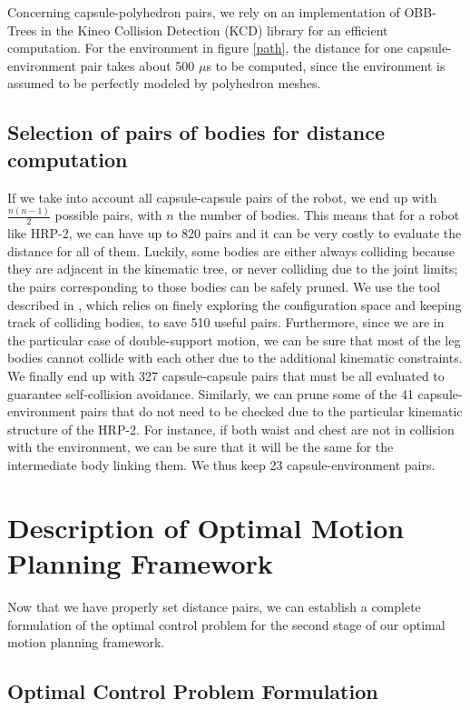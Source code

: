 Concerning capsule-polyhedron pairs, we rely on an implementation of
OBB-Trees in the Kineo Collision Detection (KCD) library
\cite{Laumond2006} for an efficient computation. For the environment
in figure \ref{path}, the distance for one capsule-environment pair
takes about 500 $\mu$s to be computed, since the environment is
assumed to be perfectly modeled by polyhedron meshes.

\subsection{Selection of pairs of bodies for distance computation}
If we take into account all capsule-capsule pairs of the robot, we end
up with $\frac{n(n - 1)}{2}$ possible pairs, with $n$ the number of
bodies. This means that for a robot like HRP-2, we can have up to 820
pairs and it can be very costly to evaluate the distance for all of
them. Luckily, some bodies are either always colliding because they
are adjacent in the kinematic tree, or never colliding due to the
joint limits; the pairs corresponding to those bodies can be safely
pruned. We use the tool described in \cite{planning-environment},
which relies on finely exploring the configuration space and keeping
track of colliding bodies, to save 510 useful pairs. Furthermore,
since we are in the particular case of double-support motion, we can
be sure that most of the leg bodies cannot collide with each other due
to the additional kinematic constraints. We finally end up with 327
capsule-capsule pairs that must be all evaluated to guarantee
self-collision avoidance. Similarly, we can prune some of the 41
capsule-environment pairs that do not need to be checked due to the
particular kinematic structure of the HRP-2. For instance, if both
waist and chest are not in collision with the environment, we can be
sure that it will be the same for the intermediate body linking
them. We thus keep 23 capsule-environment pairs.

\section{Description of Optimal Motion Planning Framework}
\label{framework}

Now that we have properly set distance pairs, we can establish a
complete formulation of the optimal control problem for the second
stage of our optimal motion planning framework.

\subsection{Optimal Control Problem Formulation}

